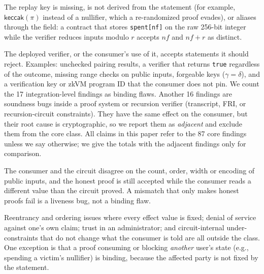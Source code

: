The replay key is missing, is not derived from the statement (for example,
$\mathsf{keccak}(\pi)$ instead of a nullifier, which a re-randomized proof
evades), or aliases through the field: a contract that stores
\texttt{spent[nf]} on the raw 256-bit integer while the verifier reduces
inputs modulo $r$ accepts $nf$ and $nf+r$ as distinct.

The deployed verifier, or the consumer's use of it, accepts statements it
should reject. Examples: unchecked pairing results, a verifier that returns
\texttt{true} regardless of the outcome, missing range checks on public inputs,
forgeable keys ($\gamma=\delta$), and a verification key or zkVM program ID
that the consumer does not pin. We count the 17 integration-level findings as
binding flaws. Another 16 findings are soundness bugs inside a proof system or
recursion verifier (transcript, FRI, or recursion-circuit constraints). They
have the same effect on the consumer, but their root cause is cryptographic,
so we report them as \emph{adjacent} and exclude them from the core class.
All claims in this paper refer to the 87 core findings unless we say
otherwise; we give the totals with the adjacent findings only for comparison.

The consumer and the circuit disagree on the count, order, width or encoding
of public inputs, and the honest proof is still accepted while the consumer
reads a different value than the circuit proved. A mismatch that only makes
honest proofs fail is a liveness bug, not a binding flaw.

Reentrancy and ordering issues where every effect value is fixed; denial of
service against one's own claim; trust in an administrator; and
circuit-internal under-constraints that do not change what the consumer is told
are all outside the class. One exception is that a proof consuming or
blocking \emph{another} user's state (e.g., spending a victim's nullifier) is
binding, because the affected party is not fixed by the statement.
